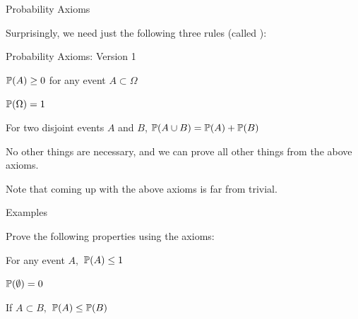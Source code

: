 \documentclass[fleqn,aspectratio=169]{beamer}
\begin{document}
\begin{frame}{Probability Axioms}

\plitemsep 0.1in

\bci 

\item<1-> Surprisingly, we need just the following three rules (called ):

\medskip

{
\begin{block}{Probability Axioms: Version 1}

\bce[{A}1.] 
\item {} $\mathbb{P}( A ) \geq 0$ for any event $A \subset \Omega$
\item {} $\mathbb{P}( \Omega ) = 1$
\item {} For two disjoint events $A$ and $B$, $\mathbb{P}( A \cup B ) = \mathbb{P}( A ) + \mathbb{P}( B )$
\ece
\end{block}
}

\item<3-> No other things are necessary, and we can prove all other 
things from the above axioms.

\item<4-> Note that coming up with the above axioms is far from trivial. 

\eci

\end{frame}

\begin{frame}{Examples}

Prove the following properties using the axioms: \hfill {}

\plitemsep 0.1in


\bce 
\item For any event $A,$ $\mathbb{P}( A ) \leq 1$

\item $\mathbb{P}( \emptyset ) = 0$

\item If $A \subset B,$ $\mathbb{P}( A ) \leq \mathbb{P}( B )$
\ece

\end{frame}
\end{document}
